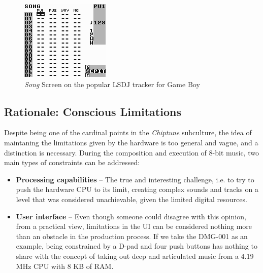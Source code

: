 \documentclass[]{article}
\begin{document}
        \begin{figure}[h]
            \centering
            \includegraphics[width=.5\textwidth]{lsdj-song-screen.png}
            \caption{\emph{Song} Screen on the popular LSDJ tracker for Game Boy \cite{KOTLINSKI2007}}
            \label{fig:lsdj}
        \end{figure}


    \subsection{Rationale: Conscious Limitations}
            Despite being one of the cardinal points in the \emph{Chiptune} subculture, the idea of 
            maintaning the limitations given by the hardware is too general and vague, and a distinction is 
            necessary. During the composition and execution of 8-bit music, two main types of constraints can be addressed:

            \begin{itemize}
            \item \textbf{Processing capabilities} -- The true and interesting challenge, i.e. to try to push the 
                    hardware CPU to its limit, creating complex sounds and tracks on a level that was considered 
                    unachievable, given the limited digital resources.
            \item \textbf{User interface} -- Even though someone could disagree with this opinion, from a practical view, limitations in the UI
                    can be considered nothing more than an obstacle in the production process. If we take the DMG-001 as an example, being constrained
                    by a D-pad and four push buttons has nothing to share with the concept of taking out deep and articulated music from a 4.19 MHz CPU with 8 KB of RAM.
            \end{itemize}
\end{document}
